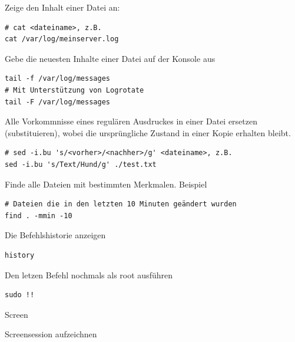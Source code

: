 \documentclass[]{article}
\begin{document}
Zeige den Inhalt einer Datei an:
\begin{verbatim}
# cat <dateiname>, z.B.
cat /var/log/meinserver.log
\end{verbatim}

Gebe die neuesten Inhalte einer Datei auf der Konsole aus
\begin{verbatim}
tail -f /var/log/messages
# Mit Unterstützung von Logrotate
tail -F /var/log/messages
\end{verbatim}

Alle Vorkommnisse eines regulären Ausdruckes in einer Datei ersetzen (substituieren), wobei die ursprüngliche Zustand in einer Kopie erhalten bleibt.
\begin{verbatim}
# sed -i.bu 's/<vorher>/<nachher>/g' <dateiname>, z.B.
sed -i.bu 's/Text/Hund/g' ./test.txt
\end{verbatim}

Finde alle Dateien mit bestimmten Merkmalen. Beispiel
\begin{verbatim}
# Dateien die in den letzten 10 Minuten geändert wurden 
find . -mmin -10
\end{verbatim}

Die Befehlshistorie anzeigen
\begin{verbatim}
history
\end{verbatim}

Den letzen Befehl nochmals als root ausführen
\begin{verbatim}
sudo !!
\end{verbatim}

Screen

Screensession aufzeichnen

\printbibliography
\end{document}
